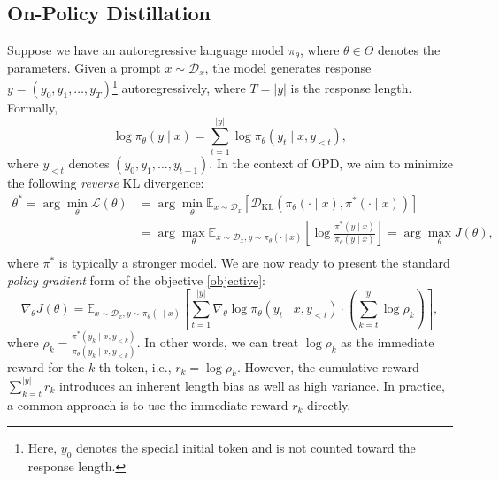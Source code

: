 \documentclass{article}
\theoremstyle{plain}
\theoremstyle{definition}
\theoremstyle{remark}
\begin{document}
\subsection{On-Policy Distillation}\label{On-Policy Distillation}
Suppose we have an autoregressive language model $\pi_{\theta}$, where $\theta\in\Theta$ denotes the parameters. Given a prompt $x\sim\mathcal{D}_x$, the model generates response $y=(y_0,y_1,\dots,y_T)$\footnote{Here, $y_0$ denotes the special initial token and is not counted toward the response length.} autoregressively, where $T=\lvert y\rvert$ is the response length. Formally,
\begin{equation}
	\log\pi_{\theta}(y\mid x)=\sum_{t=1}^{\lvert y\rvert}\log\pi_{\theta}(y_t\mid x,y_{<t}),
\end{equation}
where $y_{<t}$ denotes $(y_0,y_1,\dots,y_{t-1})$. In the context of OPD, we aim to minimize the following \textit{reverse} KL divergence:
\begin{equation}\label{objective}
	\begin{split}
		\theta^*=\arg\min_{\theta}\mathcal{L}(\theta)&=\arg\min_{\theta}\mathbb{E}_{x\sim\mathcal{D}_x}\left[\mathcal{D}_{\mathrm{KL}}(\pi_{\theta}(\cdot\mid x),\pi^*(\cdot\mid x))\right]\\
		&=\arg\max_{\theta}\mathbb{E}_{x\sim\mathcal{D}_x,y\sim\pi_{\theta}(\cdot\mid x)}\left[\log\frac{\pi^*(y\mid x)}{\pi_{\theta}(y\mid x)}\right]=\arg\max_{\theta}J(\theta),\\
	\end{split}
\end{equation}
where $\pi^*$ is typically a stronger model. We are now ready to present the standard \textit{policy gradient} form of the objective \eqref{objective}:
\begin{equation}\label{policy gradient}
	\nabla_{\theta}J(\theta)=\mathbb{E}_{x\sim\mathcal{D}_x,y\sim\pi_{\theta}(\cdot\mid x)}\left[\sum_{t=1}^{\lvert y\rvert}\nabla_{\theta}\log\pi_{\theta}(y_t\mid x,y_{<t})\cdot\left(\sum_{k=t}^{\lvert y\rvert}\log\rho_k\right)\right],
\end{equation}
where $\rho_k=\frac{\pi^*(y_k\mid x,y_{<k})}{\pi_{\theta}(y_k\mid x,y_{<k})}$. In other words, we can treat $\log\rho_k$ as the immediate reward for the $k$-th token, i.e., $r_k=\log\rho_k$. However, the cumulative reward $\sum_{k=t}^{\lvert y\rvert}r_k$ introduces an inherent length bias as well as high variance. In practice, a common approach is to use the immediate reward $r_k$ directly.
\end{document}
